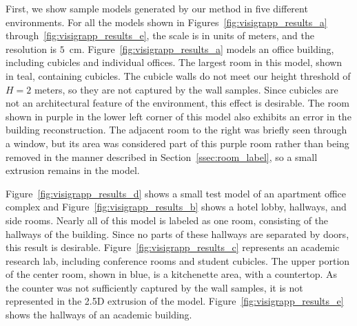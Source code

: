 \documentclass[12pt,onecolumn,oneside]{book}
\begin{document}
First, we show sample models generated by our method in five different environments.  For all the models shown in Figures~\ref{fig:visigrapp_results_a} through~\ref{fig:visigrapp_results_e}, the scale is in units of meters, and the resolution is $5$~cm.  Figure~\ref{fig:visigrapp_results_a} models an office building, including cubicles and individual offices.  The largest room in this model, shown in teal, containing cubicles.  The cubicle walls do not meet our height threshold of $H=2$ meters, so they are not captured by the wall samples.  Since cubicles are not an architectural feature of the environment, this effect is desirable.  The room shown in purple in the lower left corner of this model also exhibits an error in the building reconstruction.  The adjacent room to the right was briefly seen through a window, but its area was considered part of this purple room rather than being removed in the manner described in Section~\ref{ssec:room_label}, so a small extrusion remains in the model.

Figure~\ref{fig:visigrapp_results_d} shows a small test model of an apartment office complex and Figure~\ref{fig:visigrapp_results_b} shows a hotel lobby, hallways, and side rooms.  Nearly all of this model is labeled as one room, consisting of the hallways of the building.  Since no parts of these hallways are separated by doors, this result is desirable.  Figure~\ref{fig:visigrapp_results_c} represents an academic research lab, including conference rooms and student cubicles.  The upper portion of the center room, shown in blue, is a kitchenette area, with a countertop.  As the counter was not sufficiently captured by the wall samples, it is not represented in the 2.5D extrusion of the model. Figure~\ref{fig:visigrapp_results_e} shows the hallways of an academic building.
\end{document}
